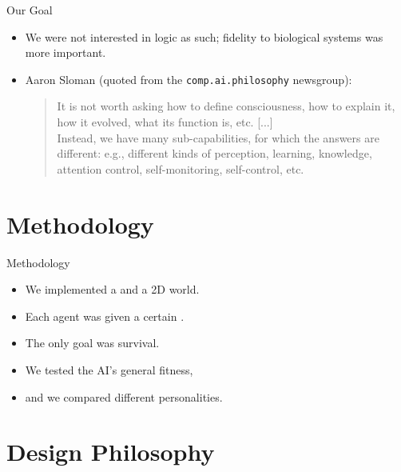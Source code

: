    \begin{frame}{Our Goal}
      \begin{itemize}
         \item We were not interested in logic as such; fidelity to biological systems was more important.
         
         \medskip
         
         \item Aaron Sloman (quoted from the \texttt{comp.ai.philosophy} newsgroup):
         
         \begin{quote}
            It is not worth asking how to define consciousness, how to explain it, how it
            evolved, what its function is, etc. [...]\\
            Instead, we have many sub-capabilities, for which the answers are different: e.g., different kinds of perception, learning, knowledge, attention control, self-monitoring, self-control, etc.
         \end{quote}
         
      \end{itemize}
   \end{frame}
   
   \section{Methodology}
   
   \begin{frame}{Methodology}
      \begin{itemize}
         \item We implemented a  and a 2D world.
         \item Each agent was given a certain .
         \item The only goal was survival.
         
         \vspace{1cm}
         
         \item We tested the AI's general fitness,
         \item and we compared different personalities.
      \end{itemize}
   \end{frame}
   
   \section{Design Philosophy}
   
